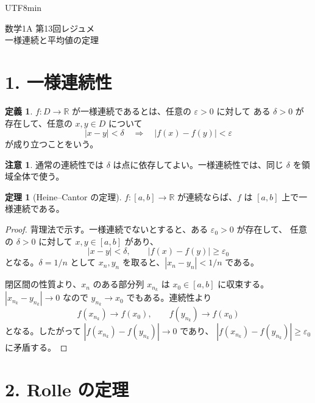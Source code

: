\documentclass[a4paper,12pt]{article}
\begin{document}
\ifPDFTeX
\begin{CJK}{UTF8}{min}
\fi

\theoremstyle{definition}
\newtheorem*{definition}{定義}
\newtheorem*{theorem}{定理}
\newtheorem*{example}{例}
\newtheorem*{remark}{注意}
\renewcommand{\proofname}{\normalfont 証明}

\begin{center}
{\LARGE 数学1A 第13回レジュメ}\\[0.4em]
一様連続と平均値の定理
\end{center}

\section*{1. 一様連続性}

\begin{definition}
$f:D\to\mathbb{R}$ が一様連続であるとは、任意の $\varepsilon>0$ に対して
ある $\delta>0$ が存在して、任意の $x,y\in D$ について
\[
|x-y|<\delta\quad\Rightarrow\quad |f(x)-f(y)|<\varepsilon
\]
が成り立つことをいう。
\end{definition}

\begin{remark}
通常の連続性では $\delta$ は点に依存してよい。一様連続性では、同じ
$\delta$ を領域全体で使う。
\end{remark}

\begin{theorem}[Heine--Cantor の定理]
$f:[a,b]\to\mathbb{R}$ が連続ならば、$f$ は $[a,b]$ 上で一様連続である。
\end{theorem}

\begin{proof}
背理法で示す。一様連続でないとすると、ある $\varepsilon_0>0$ が存在して、
任意の $\delta>0$ に対して $x,y\in[a,b]$ があり、
\[
|x-y|<\delta,\qquad |f(x)-f(y)|\ge\varepsilon_0
\]
となる。$\delta=1/n$ として $x_n,y_n$ を取ると、$|x_n-y_n|<1/n$ である。

閉区間の性質より、$x_n$ のある部分列 $x_{n_k}$ は $x_0\in[a,b]$ に収束する。
$|x_{n_k}-y_{n_k}|\to0$ なので $y_{n_k}\to x_0$ でもある。連続性より
\[
f(x_{n_k})\to f(x_0),\qquad f(y_{n_k})\to f(x_0)
\]
となる。したがって $|f(x_{n_k})-f(y_{n_k})|\to0$ であり、
$|f(x_{n_k})-f(y_{n_k})|\ge\varepsilon_0$ に矛盾する。
\end{proof}

\section*{2. Rolle の定理}


\end{CJK}
\end{document}
